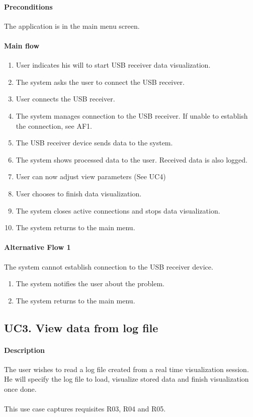 			\paragraph{Preconditions} The application is in the main menu screen.
			\paragraph{Main flow}
				\begin{enumerate}
				\item User indicates his will to start USB receiver data visualization.
				\item The system asks the user to connect the USB receiver.
				\item User connects the USB receiver.
				\item The system manages connection to the USB receiver. If unable to establish the connection, see AF1.
				\item The USB receiver device sends data to the system.
				\item The system shows processed data to the user. Received data is also logged.
				\item User can now adjust view parameters (See UC4)
				\item User chooses to finish data visualization.
				\item The system closes active connections and stops data visualization.
				\item The system returns to the main menu.
				\end{enumerate}

			\paragraph{Alternative Flow 1} The system cannot establish connection to the USB receiver device.
				\begin{enumerate}
				\item The system notifies the user about the problem.
				\item The system returns to the main menu.
				\end{enumerate}

		\subsection{UC3. View data from log file}

			\paragraph{Description} The user wishes to read a log file created from a real time visualization session. He will specify the log file to load, visualize stored data and finish visualization once done.\\
			\\This use case captures requisites R03, R04 and R05.

